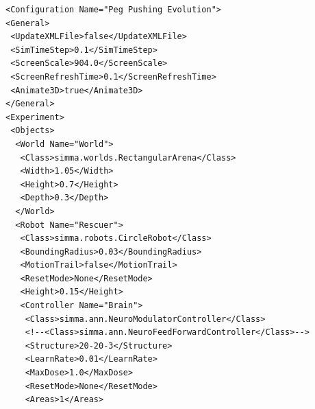\documentclass[12pt,fleqn,a4paper]{article}
\begin{document}
\lstset{language=XML}
\begin{lstlisting}
<Configuration Name="Peg Pushing Evolution">
<General>
 <UpdateXMLFile>false</UpdateXMLFile>
 <SimTimeStep>0.1</SimTimeStep>
 <ScreenScale>904.0</ScreenScale>
 <ScreenRefreshTime>0.1</ScreenRefreshTime>
 <Animate3D>true</Animate3D>
</General>
<Experiment>
 <Objects>
  <World Name="World">
   <Class>simma.worlds.RectangularArena</Class>
   <Width>1.05</Width>
   <Height>0.7</Height>
   <Depth>0.3</Depth>
  </World>
  <Robot Name="Rescuer">
   <Class>simma.robots.CircleRobot</Class>
   <BoundingRadius>0.03</BoundingRadius>
   <MotionTrail>false</MotionTrail>
   <ResetMode>None</ResetMode>
   <Height>0.15</Height>
   <Controller Name="Brain">
    <Class>simma.ann.NeuroModulatorController</Class>
    <!--<Class>simma.ann.NeuroFeedForwardController</Class>-->
    <Structure>20-20-3</Structure>
    <LearnRate>0.01</LearnRate>
    <MaxDose>1.0</MaxDose>
    <ResetMode>None</ResetMode>
    <Areas>1</Areas>
   

\end{lstlisting}
\end{document}
